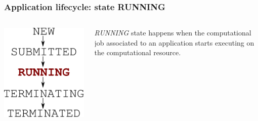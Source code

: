 \documentclass[english,serif,mathserif,xcolor=pdftex,dvipsnames,table]{beamer}
\begin{document}
\begin{frame}[fragile]
\frametitle{Application lifecycle: state RUNNING}
\begin{columns}[c]
  \begin{column}{0.5\textwidth}
    \includegraphics[height=0.7\textheight]{fig/state-RUNNING}
  \end{column}
  \begin{column}{0.4\textwidth}
    \raggedleft

    \emph{RUNNING} state happens when the computational job associated to an
    application starts executing on the computational resource.
  \end{column}
\end{columns}
\end{frame}
\end{document}

